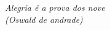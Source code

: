 \documentclass[
	12pt,				%
	openright,			%
	twoside,			%
	a4paper,			%
	english,			%
	french,				%
	spanish,			%
	brazil				%
	]{abntex2}
\begin{document}

%
%
%



%


\begin{epigrafe}
    \vspace*{\fill}
	\begin{flushright}
		\textit{Alegria é a prova dos nove \\(Oswald de andrade)}
	\end{flushright}
\end{epigrafe}

\end{document}
